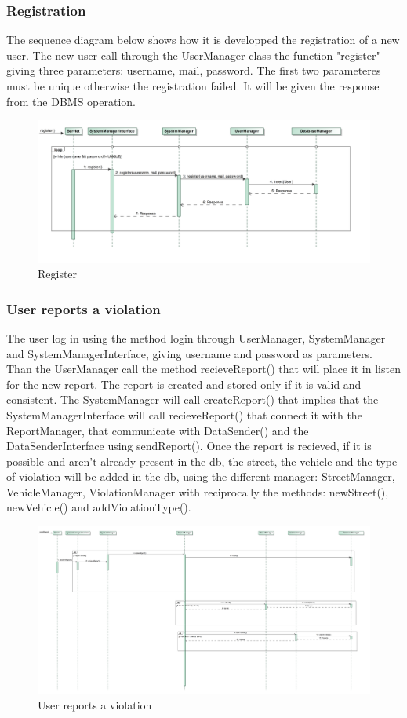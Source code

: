 \subsubsection{Registration}
The sequence diagram below shows how it is developped the registration of a new user. The new user call through the UserManager class the function "register" giving three parameters: username, mail, password. The first two parameteres must be unique otherwise the registration failed.
It will be given the response from the DBMS operation.
\newpage
\begin{figure}
	\centering
	\includegraphics[width=0.95\linewidth, height=0.37\textheight]{Images/RunTimeDiagram/Sequence1}
	\caption{Register}
	\label{fig:Register}
\end{figure}
\subsubsection{User reports a violation}
The user log in using the method login through UserManager, SystemManager and SystemManagerInterface, giving username and password as parameters.
Than the UserManager call the method recieveReport() that will place it in listen for the new report. The report is created and stored only if it is valid and consistent. The SystemManager will call createReport() that implies that the SystemManagerInterface will call recieveReport() that connect it with the ReportManager, that communicate with DataSender() and the DataSenderInterface using sendReport().
Once the report is recieved, if it is possible and aren't already present in the db, the street, the vehicle and the type of violation will be added in the db, using the different manager: StreetManager, VehicleManager, ViolationManager with reciprocally the methods: newStreet(), newVehicle() and addViolationType().
\begin{figure} 
	\centering
	\includegraphics[width=0.95\linewidth, height=0.7\textheight]{Images/RunTimeDiagram/Sequence2}
	\caption{User reports a violation}
	\label{fig:User reports a violation}
\end{figure}
